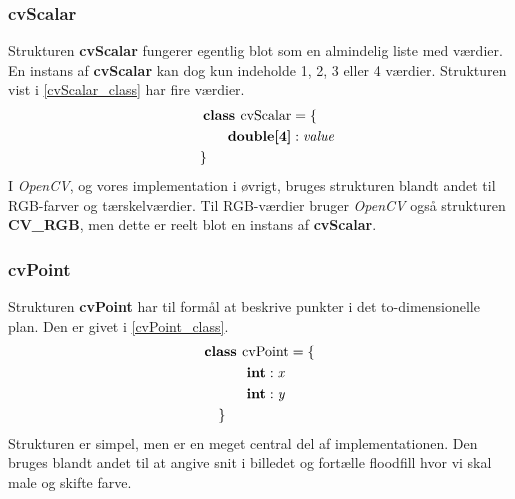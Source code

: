 {\subsubsection{cvScalar}
Strukturen \textbf{cvScalar} fungerer egentlig blot som en almindelig
liste med værdier. En instans af \textbf{cvScalar} kan dog kun indeholde
1, 2, 3 eller 4 værdier. Strukturen vist i \eqref{cvScalar_class} har fire
værdier.
\begin{multline}
    \textbf{class~} \textrm{cvScalar} = \{ \\
    \shoveleft{\qquad\textbf{double[4]} : \textit{value}} \\
    \shoveleft{\}}\shoveright{}
    \label{cvScalar_class}
\end{multline}
I \emph{OpenCV}, og vores implementation i øvrigt, bruges strukturen
blandt andet til RGB-farver og tærskelværdier. Til RGB-værdier bruger
\emph{OpenCV} også strukturen \textbf{CV\_RGB}, men dette er reelt blot
en instans af \textbf{cvScalar}.

\subsubsection{cvPoint}
Strukturen \textbf{cvPoint} har til formål at beskrive punkter i det
to-dimensionelle plan. Den er givet i \eqref{cvPoint_class}.
\begin{multline}
    \textbf{class~} \textrm{cvPoint} = \{ \\
    \shoveleft{\qquad\textbf{int} : \textit{x}} \\
    \shoveleft{\qquad\textbf{int} : \textit{y}} \\
    \shoveleft{\}}\shoveright{}
    \label{cvPoint_class}
\end{multline}
Strukturen er simpel, men er en meget central del af implementationen.
Den bruges blandt andet til at angive snit i billedet og fortælle
floodfill hvor vi skal male og skifte farve.

}

